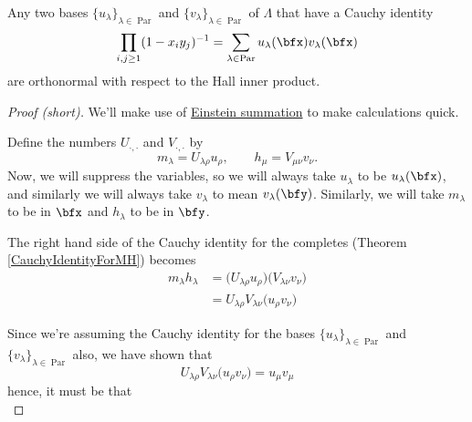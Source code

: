 \documentclass{article}
\DeclareMathOperator{\Par}{Par}
\begin{document}
\begin{theorem}\label{thm:CauchyIdentityImpliesOrthonormal}
    Any two bases $\{u_\lambda\}_{\lambda\in\Par}$ and $\{v_\lambda\}_{\lambda\in\Par}$ of $\Lambda$ that have a Cauchy identity
    \begin{equation}\label{eq:CauchyIdentityArbitrary}
        \prod_{i,j \geq 1}(1 - x_iy_j)^{-1}
        =
        \sum_{\lambda\in\Par}
        u_\lambda(\bfx) v_\lambda(\bfx)
    \end{equation}
    are orthonormal with respect to the Hall inner product.
\end{theorem}

\begin{proof}[Proof (short)]
    We'll make use of \href{https://en.wikipedia.org/wiki/Einstein_notation}{Einstein summation} to make calculations quick.

    Define the numbers $U_{\cdot,\cdot}$ and $V_{\cdot,\cdot}$ by
    \[
        m_\lambda = U_{\lambda\rho} u_\rho, \qquad h_\mu = V_{\mu\nu} v_\nu.
    \]
    Now, we will suppress the variables, so we will always take $u_\lambda$ to be $u_\lambda(\bfx)$, and similarly we will always take $v_\lambda$ to mean $v_\lambda(\bfy)$.
    Similarly, we will take $m_\lambda$ to be in $\bfx$ and $h_\lambda$ to be in $\bfy$.

    The right hand side of the Cauchy identity for the completes (Theorem \ref{CauchyIdentityForMH}) becomes
    \begin{align*}
        m_\lambda h_\lambda &= \Big(U_{\lambda\rho}u_\rho\Big)\Big(V_{\lambda\nu}v_\nu\Big) \\
                                                                                &= U_{\lambda\rho}V_{\lambda\nu} \Big(u_\rho v_\nu\Big)
    \end{align*}

    Since we're assuming the Cauchy identity for the bases $\{u_\lambda\}_{\lambda\in\Par}$ and $\{v_\lambda\}_{\lambda\in\Par}$ also, we have shown that
    \[
        U_{\lambda\rho}V_{\lambda\nu} \Big(u_\rho v_\nu\Big) = u_\mu v_\mu
    \]
    hence, it must be that
    \[
    \]
\end{proof}
\end{document}
